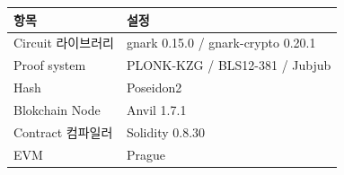 \begin{tabular}{@{}ll@{}}\toprule
        \textbf{항목}    & \textbf{설정}                        \\
        \midrule
        Circuit 라이브러리  & gnark 0.15.0 / gnark-crypto 0.20.1 \\
        Proof system   & PLONK-KZG / BLS12-381 / Jubjub     \\
        Hash           & Poseidon2                          \\
        Blokchain Node & Anvil 1.7.1                        \\
        Contract 컴파일러  & Solidity 0.8.30                    \\
        EVM            & Prague                             \\
        \bottomrule\end{tabular}
